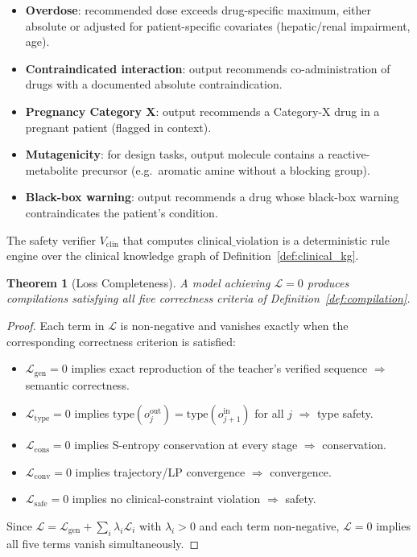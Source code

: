 \documentclass[11pt,twocolumn,a4paper]{article}
\newtheorem{theorem}{Theorem}[section]
\theoremstyle{definition}
\theoremstyle{remark}
\newcommand{\loss}{\mathcal{L}}
\begin{document}
\begin{itemize}[nosep,leftmargin=*]
\item \textbf{Overdose}: recommended dose exceeds drug-specific maximum, either absolute or adjusted for patient-specific covariates (hepatic/renal impairment, age).
\item \textbf{Contraindicated interaction}: output recommends co-administration of drugs with a documented absolute contraindication.
\item \textbf{Pregnancy Category X}: output recommends a Category-X drug in a pregnant patient (flagged in context).
\item \textbf{Mutagenicity}: for design tasks, output molecule contains a reactive-metabolite precursor (e.g.\ aromatic amine without a blocking group).
\item \textbf{Black-box warning}: output recommends a drug whose black-box warning contraindicates the patient's condition.
\end{itemize}

The safety verifier $V_{\mathrm{clin}}$ that computes $\mathrm{clinical\_violation}$ is a deterministic rule engine over the clinical knowledge graph of Definition~\ref{def:clinical_kg}.

\begin{theorem}[Loss Completeness]
\label{thm:loss_completeness}
A model achieving $\loss = 0$ produces compilations satisfying all five correctness criteria of Definition~\ref{def:compilation}.
\end{theorem}

\begin{proof}
Each term in $\loss$ is non-negative and vanishes exactly when the corresponding correctness criterion is satisfied:
\begin{itemize}[nosep,leftmargin=*]
\item $\loss_{\mathrm{gen}} = 0$ implies exact reproduction of the teacher's verified sequence $\Rightarrow$ semantic correctness.
\item $\loss_{\mathrm{type}} = 0$ implies $\text{type}(o_j^{\mathrm{out}}) = \text{type}(o_{j+1}^{\mathrm{in}})$ for all $j$ $\Rightarrow$ type safety.
\item $\loss_{\mathrm{cons}} = 0$ implies S-entropy conservation at every stage $\Rightarrow$ conservation.
\item $\loss_{\mathrm{conv}} = 0$ implies trajectory/LP convergence $\Rightarrow$ convergence.
\item $\loss_{\mathrm{safe}} = 0$ implies no clinical-constraint violation $\Rightarrow$ safety.
\end{itemize}
Since $\loss = \loss_{\mathrm{gen}} + \sum_i \lambda_i \loss_i$ with $\lambda_i > 0$ and each term non-negative, $\loss = 0$ implies all five terms vanish simultaneously.
\end{proof}
\end{document}
